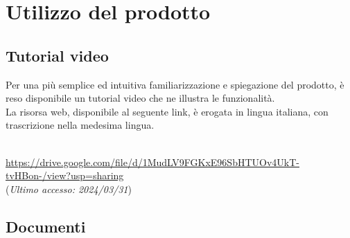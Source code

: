\chapter{Utilizzo del prodotto}\label{chap:istruzioni}

\section{Tutorial video}\label{sec:video}
Per una più semplice ed intuitiva familiarizzazione e spiegazione del prodotto, è reso disponibile un tutorial video che ne illustra le funzionalità.\\
La risorsa web, disponibile al seguente link, è erogata in lingua italiana, con trascrizione nella medesima lingua.\\ \\
\begin{footnotesize}
    \noindent \url{https://drive.google.com/file/d/1MudLV9FGKxE96SbHTUOv4UkT-tvHBon-/view?usp=sharing}\\
    \small{(\textit{Ultimo accesso: 2024/03/31})}
\end{footnotesize}
\newpage

\section{Documenti}\label{sec:documenti}
